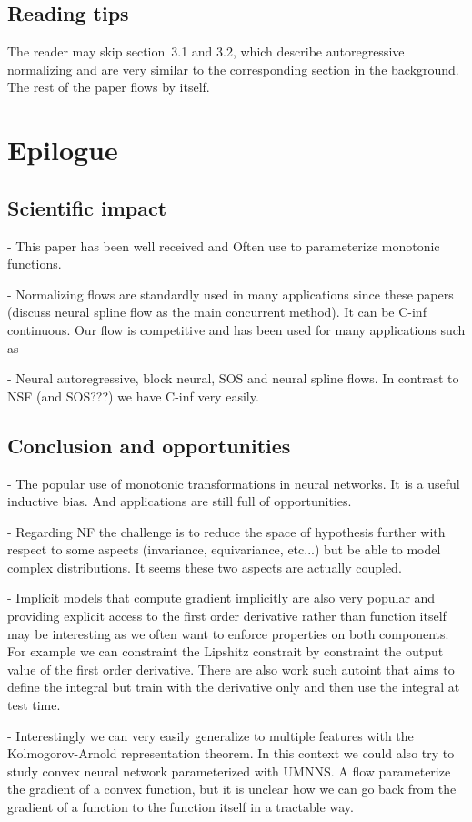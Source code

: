 \subsection{Reading tips}
The reader may skip section~3.1 and 3.2, which describe autoregressive normalizing and are very similar to the corresponding section in the background. The rest of the paper flows by itself.



\section{Epilogue} \label{epi:ch05}

\subsection{Scientific impact}
- This paper has been well received and Often use to parameterize monotonic functions.

- Normalizing flows are standardly used in many applications since these papers (discuss neural spline flow as the main concurrent method). It can be C-inf continuous. Our flow is competitive and has been used for many applications such as

- Neural autoregressive, block neural, SOS and neural spline flows. In contrast to NSF (and SOS???) we have C-inf very easily.

\subsection{Conclusion and opportunities}
- The popular use of monotonic transformations in neural networks. It is a useful inductive bias. And applications are still full of opportunities.

- Regarding NF the challenge is to reduce the space of hypothesis further with respect to some aspects (invariance, equivariance, etc...) but be able to model complex distributions. It seems these two aspects are actually coupled.

- Implicit models that compute gradient implicitly are also very popular and providing explicit access to the first order derivative rather than function itself may be interesting as we often want to enforce properties on both components. For example we can constraint the Lipshitz constrait by constraint the output value of the first order derivative. There are also work such autoint that aims to define the integral but train with the derivative only and then use the integral at test time.

- Interestingly we can very easily generalize to multiple features with the Kolmogorov-Arnold representation theorem. In this context we could also try to study convex neural network parameterized with UMNNS. A flow parameterize the gradient of a convex function, but it is unclear how we can go back from the gradient of a function to the function itself in a tractable way.
